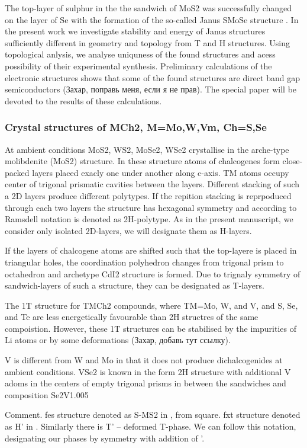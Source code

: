 \documentclass[a4paperm]{article}
\begin{document}
The top-layer of sulphur in the the sandwich of MoS2 was successfully changed on the layer of Se with the formation of the so-called Janus SMoSe structure  \cite{lu2017}.
In the present work we investigate stability and energy of Janus structures sufficiently different in geometry and topology from T and H structures.
Using topological anlysis, we analyse uniquness of the found structures and acess possibility of their experimental synthesis.
Preliminary calculations of the electronic structures shows that some of the found structures are direct band gap semiconductors (Захар, поправь меня, если я не прав).
The special paper will be devoted to the results of these calculations.


\subsubsection*{Crystal structures of MCh2, M=Mo,W,Vm, Ch=S,Se}
At ambient conditions MoS2, WS2, MoSe2, WSe2 crystallise in the arche-type molibdenite (MoS2) structure.
In these structure atoms of chalcogenes form close-packed layers placed exacly one under another along c-axis.
TM atoms occupy center of trigonal prismatic cavities between the layers.
Different stacking of such a 2D layers produce different polytypes.
If the repition stacking is reprpoduced through each two layers the structure has hexagonal symmetry and according to Ramsdell notation is denoted as 2H-polytype. 
As in the present manuscript, we consider only isolated 2D-layers, we will designate them as H-layers.

If the layers of chalcogene atoms are shifted such that the top-layere is placed in triangular holes, the coordination polyhedron changes from trigonal prism to octahedron and archetype CdI2 structure is formed. 
Due to trignaly symmetry of sandwich-layers of such a structure, they can be designated as T-layers.

The 1T structure for TMCh2 compounds, where TM=Mo, W, and V, and S, Se, and Te are less energetically favourable than 2H structres of the same compoistion.
However, these 1T structures can be stabilised by the impurities of Li atoms or by some deformations (Захар, добавь тут ссылку).

V is different from W and Mo in that it does not produce dichalcogenides at ambient conditions.
VSe2 is known in the form 2H structure with additional V adoms in the centers of empty trigonal prisms in between the sandwiches and composition Se2V1.005

Comment. 
fes structure denoted as S-MS2 in \cite{tang2021_smose}, from square.
fxt structure denoted as H' in \cite{ma2016_h'}.
Similarly there is T' – deformed T-phase.
We can follow this notation, designating our phases by symmetry with addition of '.
\end{document}
